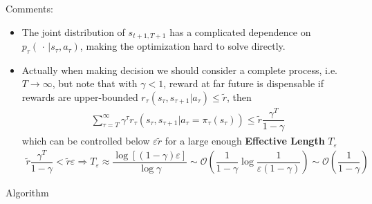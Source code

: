 Comments:
\begin{itemize}[topsep=2pt,itemsep=0pt]
    \item The joint distribution of $ s_{t+1,T+1} $ has a complicated dependence on $ p_\tau(\, \cdot \, |s_\tau,a_\tau) $, making the optimization hard to solve directly.
    \item Actually when making decision we should consider a complete process, i.e. $ T\to \infty $, but note that with $ \gamma <1 $, reward at far future is dispensable if rewards are upper-bounded $ r_\tau(s_\tau,s_{\tau+1}|a_\tau)\leq \tilde{r} $, then
    \begin{align}
        \sum_{\tau = T }^\infty\gamma ^{\tau}r_\tau\left(s_\tau,s_{\tau+1}|a_\tau=\pi_\tau(s_\tau)\right) \leq \tilde{r}\dfrac{\gamma ^T}{1-\gamma }
    \end{align}
    which can be controlled below $\varepsilon  \tilde{r} $ for a large enough \textbf{Effective Length}  $ T_\varepsilon  $
    \begin{align}
        \tilde{r}\dfrac{\gamma ^T}{1-\gamma }<\tilde{r}\varepsilon \Rightarrow T_\varepsilon \approx \dfrac{\log[(1-\gamma )\varepsilon ]}{\log \gamma }\sim \mathcal{O}\left( \dfrac{1}{1-\gamma }\log\dfrac{1}{\varepsilon (1-\gamma )} \right)\sim \mathcal{O}(\dfrac{1}{1-\gamma })
    \end{align}
\end{itemize}

\begin{point}
    Algorithm
\end{point}

